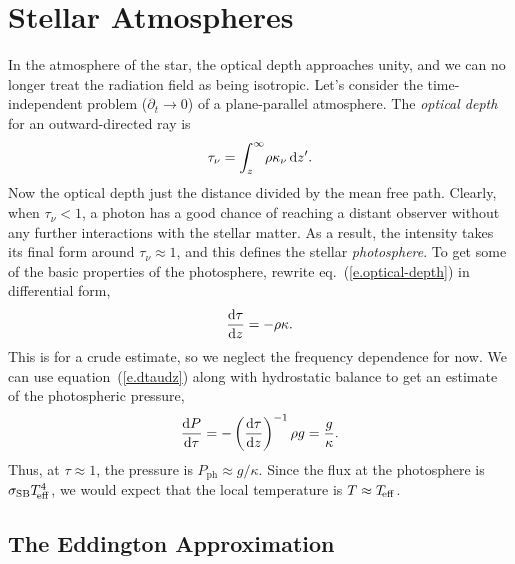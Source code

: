 \chapter[Stellar Atmospheres]{Stellar Atmospheres}
\label{s.stellar-atmospheres}

In the atmosphere of the star, the optical depth approaches unity, and we can no longer treat the radiation field as being isotropic. Let's consider the time-independent problem ($\partial_{t}\to 0$) of a plane-parallel atmosphere. The \emph{optical depth} for an outward-directed ray is
\begin{equation}\label{e.optical-depth}
\tau_{\nu} = \int _{z}^{\infty}\!\rho\kappa_{\nu}\,\mathrm{d} z'.
\end{equation}
Now the optical depth just the distance divided by the mean free path. Clearly, when $\tau_{\nu} < 1$, a photon has a good chance of reaching a distant observer without any further interactions with the stellar matter.  As a result, the intensity takes its final form around $\tau_{\nu} \approx 1$, and this defines the stellar \emph{photosphere}. To get some of the basic properties of the photosphere, rewrite eq.~(\ref{e.optical-depth}) in differential form,
\begin{equation}\label{e.dtaudz}
\frac{\mathrm{d}\tau}{\mathrm{d} z} = -\rho\kappa.
\end{equation}
This is for a crude estimate, so we neglect the frequency dependence for now.  We can use equation~(\ref{e.dtaudz}) along with hydrostatic balance to get an estimate of the photospheric pressure,
\begin{equation}\label{e.photo-pressure}
\frac{\mathrm{d} P}{\mathrm{d} \tau} = -\left(\frac{\mathrm{d} \tau}{\mathrm{d} z}\right)^{-1}\rho g = \frac{g}{\kappa}.
\end{equation}
Thus, at $\tau \approx 1$, the pressure is $P_{\mathrm{ph}}\approx g/\kappa$. Since the flux at the photosphere is $\sigma_{\mathrm{SB}} T_{\!\mathrm{eff}}^{4}$, we would expect that the local temperature is $T\approx T_{\!\mathrm{eff}}$.

\section{The Eddington Approximation}


